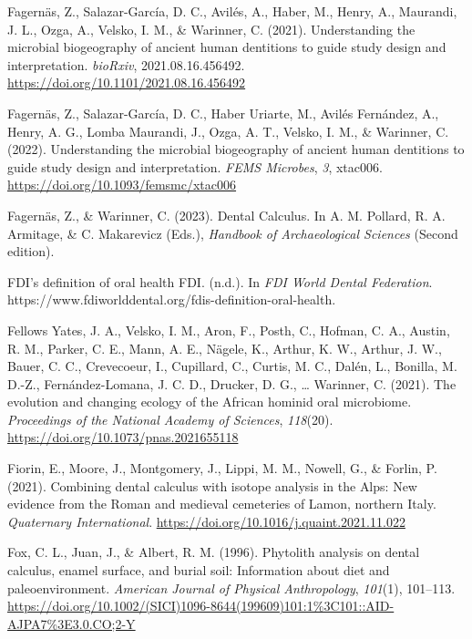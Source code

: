 \documentclass[
  b5paper,
]{book}
\newlength{\cslhangindent}
\newenvironment{CSLReferences}[2] %
 {\begin{list}{}{%
  \setlength{\itemindent}{0pt}
  \setlength{\leftmargin}{0pt}
  \setlength{\parsep}{0pt}
  \ifodd #1
   \setlength{\leftmargin}{\cslhangindent}
   \setlength{\itemindent}{-1\cslhangindent}
  \fi
  \setlength{\itemsep}{#2\baselineskip}}}
 {\end{list}}
\begin{document}
\begin{CSLReferences}{1}{0}
Fagernäs, Z., Salazar-García, D. C., Avilés, A., Haber, M., Henry, A.,
Maurandi, J. L., Ozga, A., Velsko, I. M., \& Warinner, C. (2021).
Understanding the microbial biogeography of ancient human dentitions to
guide study design and interpretation. \emph{bioRxiv},
2021.08.16.456492. \url{https://doi.org/10.1101/2021.08.16.456492}

Fagernäs, Z., Salazar-García, D. C., Haber Uriarte, M., Avilés
Fernández, A., Henry, A. G., Lomba Maurandi, J., Ozga, A. T., Velsko, I.
M., \& Warinner, C. (2022). Understanding the microbial biogeography of
ancient human dentitions to guide study design and interpretation.
\emph{FEMS Microbes}, \emph{3}, xtac006.
\url{https://doi.org/10.1093/femsmc/xtac006}

Fagernäs, Z., \& Warinner, C. (2023). Dental {Calculus}. In A. M.
Pollard, R. A. Armitage, \& C. Makarevicz (Eds.), \emph{Handbook of
{Archaeological Sciences}} (Second edition).

{FDI}'s definition of oral health \textbar{} {FDI}. (n.d.). In \emph{FDI
World Dental Federation}.
https://www.fdiworlddental.org/fdis-definition-oral-health.

Fellows Yates, J. A., Velsko, I. M., Aron, F., Posth, C., Hofman, C. A.,
Austin, R. M., Parker, C. E., Mann, A. E., Nägele, K., Arthur, K. W.,
Arthur, J. W., Bauer, C. C., Crevecoeur, I., Cupillard, C., Curtis, M.
C., Dalén, L., Bonilla, M. D.-Z., Fernández-Lomana, J. C. D., Drucker,
D. G., \ldots{} Warinner, C. (2021). The evolution and changing ecology
of the {African} hominid oral microbiome. \emph{Proceedings of the
National Academy of Sciences}, \emph{118}(20).
\url{https://doi.org/10.1073/pnas.2021655118}

Fiorin, E., Moore, J., Montgomery, J., Lippi, M. M., Nowell, G., \&
Forlin, P. (2021). Combining dental calculus with isotope analysis in
the {Alps}: {New} evidence from the {Roman} and medieval cemeteries of
{Lamon}, northern {Italy}. \emph{Quaternary International}.
\url{https://doi.org/10.1016/j.quaint.2021.11.022}

Fox, C. L., Juan, J., \& Albert, R. M. (1996). Phytolith analysis on
dental calculus, enamel surface, and burial soil: {Information} about
diet and paleoenvironment. \emph{American Journal of Physical
Anthropology}, \emph{101}(1), 101--113.
\url{https://doi.org/10.1002/(SICI)1096-8644(199609)101:1\%3C101::AID-AJPA7\%3E3.0.CO;2-Y}


\end{CSLReferences}
\end{document}
